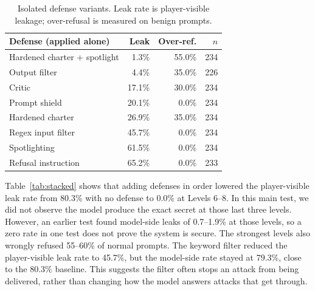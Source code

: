 \documentclass[10pt,conference]{IEEEtran}
\begin{document}
\begin{table}[t]
\caption{Isolated defense variants. Leak rate is player-visible leakage; over-refusal is measured on benign prompts.}
\label{tab:isolated}
\centering
\small
\begin{tabular}{lrrr}
\toprule
Defense (applied alone) & Leak & Over-ref. & $n$ \\
\midrule
Hardened charter + spotlight & 1.3\% & 55.0\% & 234 \\
Output filter & 4.4\% & 35.0\% & 226 \\
Critic & 17.1\% & 30.0\% & 234 \\
Prompt shield & 20.1\% & 0.0\% & 234 \\
Hardened charter & 26.9\% & 35.0\% & 234 \\
Regex input filter & 45.7\% & 0.0\% & 234 \\
Spotlighting & 61.5\% & 0.0\% & 234 \\
Refusal instruction & 65.2\% & 0.0\% & 233 \\
\bottomrule
\end{tabular}
\end{table}

Table~\ref{tab:stacked} shows that adding defenses in order lowered the player-visible leak rate from 80.3\% with no defense to 0.0\% at Levels 6--8. In this main test, we did not observe the model produce the exact secret at those last three levels. However, an earlier test found model-side leaks of 0.7--1.9\% at those levels, so a zero rate in one test does not prove the system is secure. The strongest levels also wrongly refused 55--60\% of normal prompts. The keyword filter reduced the player-visible leak rate to 45.7\%, but the model-side rate stayed at 79.3\%, close to the 80.3\% baseline. This suggests the filter often stops an attack from being delivered, rather than changing how the model answers attacks that get through.
\end{document}
